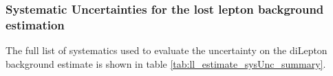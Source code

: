 \subsubsection{Systematic Uncertainties for the lost lepton background estimation}
\label{sec:bkgLL:highMET_CR:systematics}

The full list of systematics used to evaluate the uncertainty on the diLepton background estimate is shown in table \ref{tab:ll_estimate_sysUnc_summary}.  

\begin{table}[htb]
\begin{center}
\small
\caption{\label{tab:ll_estimate_sysUnc_summary} Table of uncertainties for the diLepton background estimate, range for smallest-largest variation in each signal region. }
\end{center}
\end{table}
